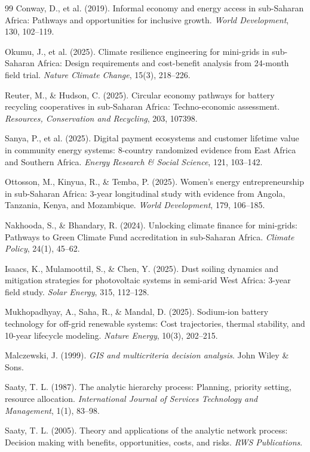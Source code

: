 \documentclass[12pt, a4paper]{article}
\begin{document}
\begin{thebibliography}{99}
 Conway, D., et al. (2019). Informal economy and energy access in sub-Saharan Africa: Pathways and opportunities for inclusive growth. \textit{World Development}, 130, 102--119.

 Okumu, J., et al. (2025). Climate resilience engineering for mini-grids in sub-Saharan Africa: Design requirements and cost-benefit analysis from 24-month field trial. \textit{Nature Climate Change}, 15(3), 218--226.

 Reuter, M., \& Hudson, C. (2025). Circular economy pathways for battery recycling cooperatives in sub-Saharan Africa: Techno-economic assessment. \textit{Resources, Conservation and Recycling}, 203, 107398.

 Sanya, P., et al. (2025). Digital payment ecosystems and customer lifetime value in community energy systems: 8-country randomized evidence from East Africa and Southern Africa. \textit{Energy Research \& Social Science}, 121, 103--142.

 Ottosson, M., Kinyua, R., \& Temba, P. (2025). Women's energy entrepreneurship in sub-Saharan Africa: 3-year longitudinal study with evidence from Angola, Tanzania, Kenya, and Mozambique. \textit{World Development}, 179, 106--185.

 Nakhooda, S., \& Bhandary, R. (2024). Unlocking climate finance for mini-grids: Pathways to Green Climate Fund accreditation in sub-Saharan Africa. \textit{Climate Policy}, 24(1), 45--62.

 Isaacs, K., Mulamoottil, S., \& Chen, Y. (2025). Dust soiling dynamics and mitigation strategies for photovoltaic systems in semi-arid West Africa: 3-year field study. \textit{Solar Energy}, 315, 112--128.

 Mukhopadhyay, A., Saha, R., \& Mandal, D. (2025). Sodium-ion battery technology for off-grid renewable systems: Cost trajectories, thermal stability, and 10-year lifecycle modeling. \textit{Nature Energy}, 10(3), 202--215.

 Malczewski, J. (1999). \textit{GIS and multicriteria decision analysis}. John Wiley \& Sons.

 Saaty, T. L. (1987). The analytic hierarchy process: Planning, priority setting, resource allocation. \textit{International Journal of Services Technology and Management}, 1(1), 83--98.

 Saaty, T. L. (2005). Theory and applications of the analytic network process: Decision making with benefits, opportunities, costs, and risks. \textit{RWS Publications}.


\end{thebibliography}
\end{document}
